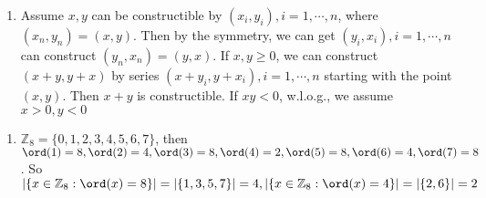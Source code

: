 \documentclass{ctexart}
\newif\ifpreface
\begin{document}
\large
\setlength{\baselineskip}{1.2em}
\ifpreface
  
  \newgeometry{left=2cm,right=2cm,top=2cm,bottom=2cm}
\else
  \maketitle
\fi
\begin{solution}
  \begin{enumerate}
    \item Assume \(x,y\) can be constructible by \((x_i,y_i),i=1,\cdots,n\), where \((x_n,y_n)=(x,y)\).
      Then by the symmetry, we can get \((y_i,x_i),i=1,\cdots,n\) can construct \((y_n,x_n)=(y,x)\).
      If \(x,y \geq 0\), we can construct \((x + y,y + x)\) by series \((x + y_i,y + x_i),i=1,\cdots,n\) starting
      with the point \((x,y)\). Then \(x + y\) is constructible.
      If \(xy <0\), w.l.o.g., we assume \(x >0,y <0\)
  \end{enumerate}

\end{solution}
\begin{solution}
  \begin{enumerate}
    \item \(\mathbb{Z}_8=\{0,1,2,3,4,5,6,7\}\), then \(\ord(1)=8,\ord(2)=4,\ord(3)=8,\ord(4)=2,\ord(5)=8,\ord(6)=4,\ord(7)=8\).
      So \(|\{x \in \mathbb{Z}_8:\ord(x)=8\}|=|\{1,3,5,7\}|=4,|\{x \in \mathbb{Z}_8 : \ord(x)=4\}|=|\{2,6\}|=2\)
  \end{enumerate}

\end{solution}
\end{document}
